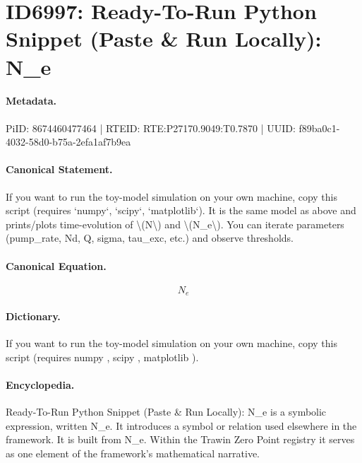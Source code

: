 \section*{ID6997: Ready-To-Run Python Snippet (Paste \& Run Locally): N\_e}
\paragraph{Metadata.}
PiID: 8674460477464 | RTEID: RTE:P27170.9049:T0.7870 | UUID: f89ba0c1-4032-58d0-b75a-2efa1af7b9ea

\paragraph{Canonical Statement.}
If you want to run the toy-model simulation on your own machine, copy this script (requires `numpy`, `scipy`, `matplotlib`). It is the same model as above and prints/plots time-evolution of \textbackslash{}(N\textbackslash{}) and \textbackslash{}(N\_e\textbackslash{}). You can iterate parameters (pump\_rate, Nd, Q, sigma, tau\_exc, etc.) and observe thresholds.

\paragraph{Canonical Equation.}
\[
N_e
\]

\paragraph{Dictionary.}
If you want to run the toy-model simulation on your own machine, copy this script (requires numpy , scipy , matplotlib ).

\paragraph{Encyclopedia.}
Ready-To-Run Python Snippet (Paste \& Run Locally): N\_e is a symbolic expression, written N\_e. It introduces a symbol or relation used elsewhere in the framework. It is built from N\_e. Within the Trawin Zero Point registry it serves as one element of the framework's mathematical narrative.
